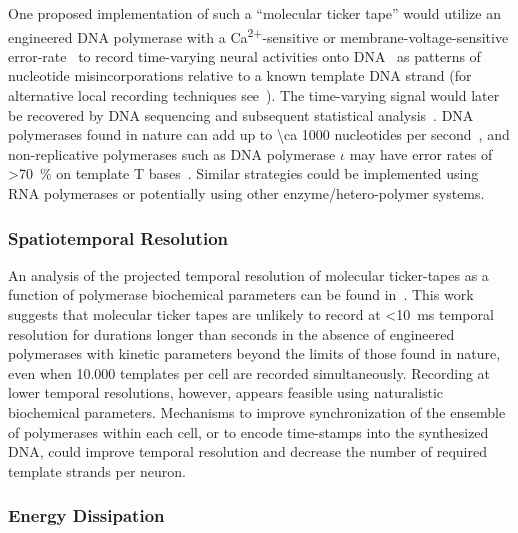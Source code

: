 One proposed implementation of such a ``molecular ticker tape'' would utilize an engineered DNA polymerase with a Ca\textsuperscript{2$+$}-sensitive or membrane-voltage-sensitive error-rate~\cite{zamft12} to record time-varying neural activities onto DNA~\cite{glaser13} as patterns of nucleotide misincorporations relative to a known template DNA strand (for alternative local recording techniques see~\cite{friedland09,bonnet13}).
The time-varying signal would later be recovered by DNA sequencing and subsequent statistical analysis~\cite{glaser13}.
DNA polymerases found in nature can add up to \num{\ca 1000} nucleotides per second~\cite{kelman95}, and non-replicative polymerases such as DNA polymerase $\iota$ may have error rates of \SI{>70}{\percent} on template T bases~\cite{frank07}.
Similar strategies could be implemented using RNA polymerases or potentially using other enzyme/hetero-polymer systems.

\subsubsection{Spatiotemporal Resolution}

An analysis of the projected temporal resolution of molecular ticker-tapes as a function of polymerase biochemical parameters can be found in~\cite{glaser13}.
This work suggests that molecular ticker tapes are unlikely to record at \SI{<10}{\ms} temporal resolution for durations longer than seconds in the absence of engineered polymerases with kinetic parameters beyond the limits of those found in nature, even when \num{10,000} templates per cell are recorded simultaneously.
Recording at lower temporal resolutions, however, appears feasible using naturalistic biochemical parameters.
Mechanisms to improve synchronization of the ensemble of polymerases within each cell, or to encode time-stamps into the synthesized DNA, could improve temporal resolution and decrease the number of required template strands per neuron.

\subsubsection{Energy Dissipation}
